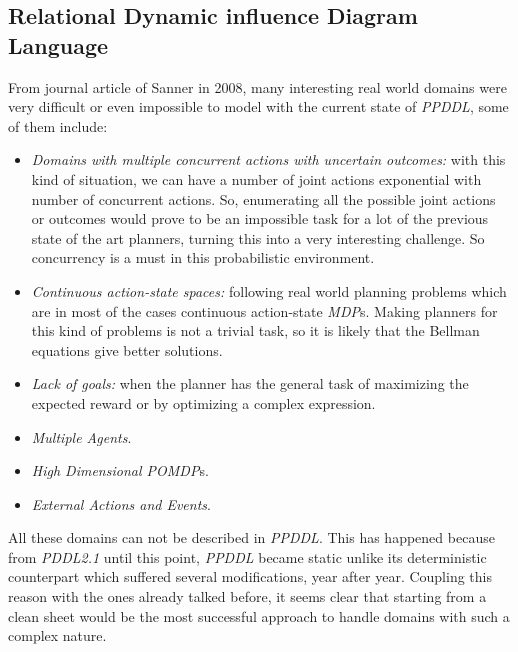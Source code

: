 \subsection{Relational Dynamic influence Diagram Language}
From journal article of Sanner \cite{Sanner2008} in 2008, many interesting
real world domains were very difficult or even impossible to model
with the current state of \textit{PPDDL}, some of them include:
\begin{itemize}
    \item \textit{Domains with multiple concurrent actions with uncertain
    outcomes:} with this kind of situation, we can have a number of joint
    actions exponential with number of concurrent actions. So, enumerating all
    the possible joint actions or outcomes would prove to be an impossible task
    for a lot of the previous state of the art planners, turning this into a
    very interesting challenge. So concurrency is a must in this probabilistic
    environment.
    \item \textit{Continuous action-state spaces:} following real world planning
    problems which are in most of the cases continuous action-state
    \textit{MDP}s. Making planners for this kind of problems is not a trivial
    task, so it is likely that the Bellman equations give better solutions.
    \item \textit{Lack of goals:} when the planner has the general task of
    maximizing the expected reward or by optimizing a complex expression.
    \item \textit{Multiple Agents}.
    \item \textit{High Dimensional POMDP}s.
    \item \textit{External Actions and Events}.
\end{itemize}
All these domains can not be described in \textit{PPDDL}. This has happened
because from \textit{PDDL2.1} until this point, \textit{PPDDL} became static
unlike its deterministic counterpart which suffered several modifications, year
after year. Coupling this reason with the ones already talked before, it seems
clear that starting from a clean sheet would be the most successful approach to
handle domains with such a complex nature.

